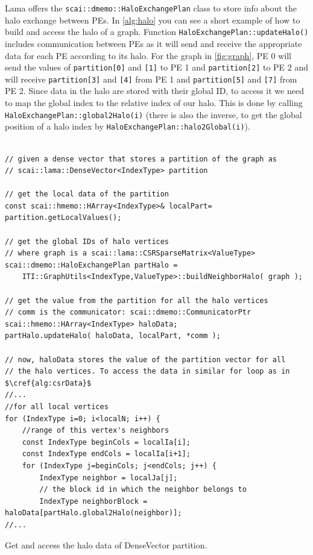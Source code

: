 \documentclass[a4paper,10pt]{article}
\newcommand{\MI}[1]{\texttt{#1}}
\begin{document}
Lama offers the \MI{scai::dmemo::HaloExchangePlan} class to store info about the halo 
exchange between PEs. In \cref{alg:halo} you can see a short example of how to build 
and access the halo of a graph. 
Function \MI{HaloExchangePlan::updateHalo()} includes communication between PEs as it
will send and receive the appropriate data for each PE according to its halo.
For the graph in \cref{fig:graph}, PE 0 will send the values of \MI{partition[0]} and \MI{[1]}
to PE 1 and \MI{partition[2]} to PE 2 and will receive \MI{partition[3]} and \MI{[4]} from
PE 1 and \MI{partition[5]} and \MI{[7]} from PE 2. Since data in the halo are stored with their
global ID, to access it we need to map the global index to the relative index of our halo.
This is done by calling \MI{HaloExchangePlan::global2Halo(i)} (there is also the inverse,
to get the global position of a halo index by \MI{HaloExchangePlan::halo2Global(i)}).

\begin{algorithm}[t]
\begin{verbatim}

// given a dense vector that stores a partition of the graph as
// scai::lama::DenseVector<IndexType> partition

// get the local data of the partition
const scai::hmemo::HArray<IndexType>& localPart= partition.getLocalValues();

// get the global IDs of halo vertices
// where graph is a scai::lama::CSRSparseMatrix<ValueType>
scai::dmemo::HaloExchangePlan partHalo = 
	ITI::GraphUtils<IndexType,ValueType>::buildNeighborHalo( graph );

// get the value from the partition for all the halo vertices
// comm is the communicator: scai::dmemo::CommunicatorPtr
scai::hmemo::HArray<IndexType> haloData;
partHalo.updateHalo( haloData, localPart, *comm );	

// now, haloData stores the value of the partition vector for all
// the halo vertices. To access the data in similar for loop as in $\cref{alg:csrData}$
//...
//for all local vertices
for (IndexType i=0; i<localN; i++) {
	//range of this vertex's neighbors
	const IndexType beginCols = localIa[i];
	const IndexType endCols = localIa[i+1];
	for (IndexType j=beginCols; j<endCols; j++) {
		IndexType neighbor = localJa[j];
		// the block id in which the neighbor belongs to
		IndexType neighborBlock = haloData[partHalo.global2Halo(neighbor)];
//...
\end{verbatim}
\caption{Get and access the halo data of DenseVector partition.}
\label{alg:halo}
\end{algorithm}
\end{document}
